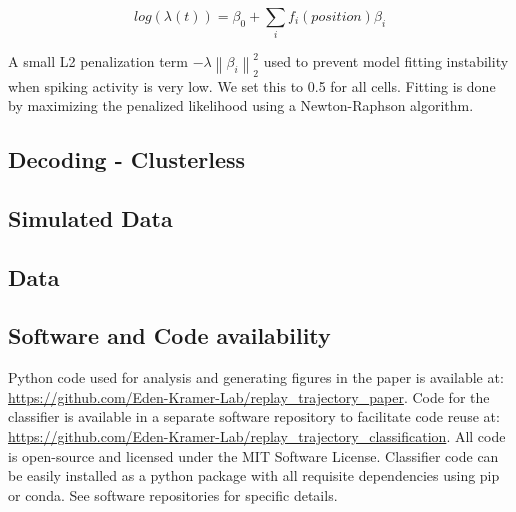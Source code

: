\documentclass[times, twoside, watermark]{zHenriquesLab-StyleBioRxiv}
\newcommand{\norm}[1]{\left\lVert #1 \right\rVert}
\begin{document}
$$log(\lambda(t)) = \beta_{0} + \sum_{i} f_{i}(position)\beta_{i}$$

A small L2 penalization term $-\lambda\norm{\beta_{i}}_{2}^{2}$ used to prevent model fitting instability when spiking activity is very low. We set this to 0.5 for all cells. Fitting is done by maximizing the penalized likelihood using a Newton-Raphson algorithm.

\subsection*{Decoding - Clusterless}


\subsection*{Simulated Data}

\subsection*{Data}

\subsection*{Software and Code availability}
Python code used for analysis and generating figures in the paper is available at: \url{https://github.com/Eden-Kramer-Lab/replay_trajectory_paper}. Code for the classifier is available in a separate software repository to facilitate code reuse at: \url{https://github.com/Eden-Kramer-Lab/replay_trajectory_classification}. All code is open-source and licensed under the MIT Software License. Classifier code can be easily installed as a python package with all requisite dependencies using pip or conda. See software repositories for specific details.
\end{document}
